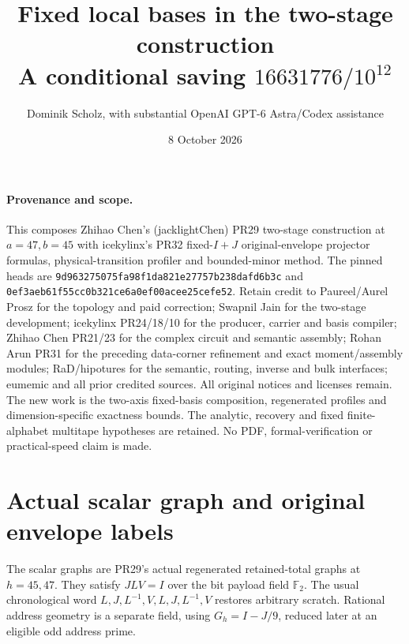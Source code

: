 \documentclass[11pt]{article}
\begin{document}
\title{Fixed local bases in the two-stage construction\\
\large A conditional saving $16631776/10^{12}$}
\author{Dominik Scholz, with substantial OpenAI GPT-6 Astra/Codex assistance}
\date{8 October 2026}\maketitle

\paragraph{Provenance and scope.}
This composes Zhihao Chen's (jacklightChen) PR29 two-stage construction
at $a=47,b=45$ with icekylinx's PR32 fixed-$I+J$ original-envelope
projector formulas, physical-transition profiler and bounded-minor method.
The pinned heads are \texttt{9d963275075fa98f1da821e27757b238dafd6b3c}
and \texttt{0ef3aeb61f55cc0b321ce6a0ef00acee25cefe52}.
Retain credit to Paureel/Aurel Prosz for the topology and paid correction;
Swapnil Jain for the two-stage development; icekylinx PR24/18/10 for the
producer, carrier and basis compiler; Zhihao Chen PR21/23 for the complex
circuit and semantic assembly; Rohan Arun PR31 for the preceding data-corner
refinement and exact moment/assembly modules; RaD/hipotures for the semantic,
routing, inverse and bulk interfaces; eumemic and all prior credited sources.
All original notices and licenses remain. The new work is the two-axis
fixed-basis composition, regenerated profiles and dimension-specific exactness
bounds. The analytic, recovery and fixed finite-alphabet multitape hypotheses
are retained. No PDF, formal-verification or practical-speed claim is made.

\section{Actual scalar graph and original envelope labels}
The scalar graphs are PR29's actual regenerated retained-total graphs at
$h=45,47$. They satisfy $JLV=I$ over the bit payload field $\mathbb F_2$.
The usual chronological word $L,J,L^{-1},V,L,J,L^{-1},V$ restores arbitrary
scratch. Rational address geometry is a separate field, using
$G_h=I-J/9$, reduced later at an eligible odd address prime.
\end{document}
